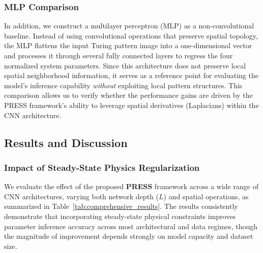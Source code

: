 \documentclass{article} %
\begin{document}
\subsubsection{MLP Comparison}

In addition, we construct a multilayer perceptron (MLP) as a non-convolutional baseline. Instead of using convolutional operations that preserve spatial topology, the MLP flattens the input Turing pattern image into a one-dimensional vector and processes it through several fully connected layers to regress the four normalized system parameters. Since this architecture does not preserve local spatial neighborhood information, it serves as a reference point for evaluating the model's inference capability \emph{without} exploiting local pattern structures. This comparison allows us to verify whether the performance gains are driven by the PRESS framework's ability to leverage spatial derivatives (Laplacians) within the CNN architecture.

\subsection{Results and Discussion}

\subsubsection{Impact of Steady-State Physics Regularization}

We evaluate the effect of the proposed \textbf{PRESS} framework across a wide range of CNN architectures, varying both network depth ($L$) and spatial operations, as summarized in Table~\ref{tab:comprehensive_results}. The results consistently demonstrate that incorporating steady-state physical constraints improves parameter inference accuracy across most architectural and data regimes, though the magnitude of improvement depends strongly on model capacity and dataset size.
\end{document}
